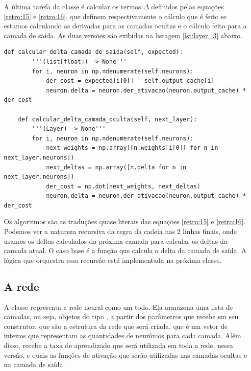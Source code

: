 A última tarefa da classe  é calcular os termos $\Delta$ definidos pelas equações \ref{retro:15} e \ref{retro:16}, que definem respectivamente o cálculo que é feito se estamos calculando as derivadas para as camadas ocultas e o cálculo feito para a camada de saída. As duas versões são exibidas na listagem \ref{lst:layer_3} abaixo.
\newline
\estiloR
\begin{lstlisting}[caption={Trecho da classe \eng{Layer}}, label={lst:layer_3}, escapeinside={\%}]
def calcular_delta_camada_de_saida(self, expected):
        '''(list[float]) -> None'''
        for i, neuron in np.ndenumerate(self.neurons):
            der_cost = expected[i[0]] - self.output_cache[i]
            neuron.delta = neuron.der_ativacao(neuron.output_cache) * der_cost

    def calcular_delta_camada_oculta(self, next_layer):
        '''(Layer) -> None'''
        for i, neuron in np.ndenumerate(self.neurons):
            next_weights = np.array([n.weights[i[0]] for n in next_layer.neurons])
            next_deltas = np.array([n.delta for n in next_layer.neurons])
            der_cost = np.dot(next_weights, next_deltas)
            neuron.delta = neuron.der_ativacao(neuron.output_cache) * der_cost
\end{lstlisting}


Os algoritmos são as traduções quase literais das equações \ref{retro:15} e \ref{retro:16}. Podemos ver a natureza recursiva da regra da cadeia nas 2 linhas finais, onde usamos os deltas calculados da próxima camada para calcular os deltas da camada atual. O caso base é a função que calcula o delta da camada de saída. A lógica que orquestra essa recursão está implementada na próxima classe.

\subsection{A rede}

A classe  representa a rede neural como um todo. Ela armazena uma lista de camadas, ou seja, objetos do tipo , a partir dos parâmetros que recebe em seu construtor, que são a estrutura da rede que será criada, que é um vetor de inteiros que representam as quantidades de neurônios para cada camada. Além disso, recebe a taxa de aprendizado que será utilizada em toda a rede, nessa versão, e quais as funções de ativação que serão utilizadas nas camadas ocultas e na camada de saída.

